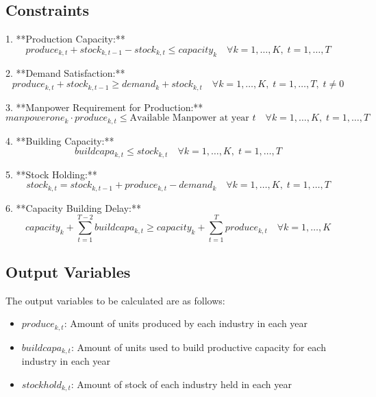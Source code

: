 \documentclass{article}
\begin{document}
\subsection*{Constraints}

1. **Production Capacity:**
   \[
   produce_{k, t} + stock_{k, t-1} - stock_{k, t} \leq capacity_{k} \quad \forall k = 1,\ldots,K, \; t = 1,\ldots,T
   \]

2. **Demand Satisfaction:**
   \[
   produce_{k, t} + stock_{k, t-1} \geq demand_{k} + stock_{k, t} \quad \forall k = 1,\ldots,K, \; t = 1,\ldots,T, \; t \neq 0
   \]

3. **Manpower Requirement for Production:**
   \[
   manpowerone_{k} \cdot produce_{k, t} \leq \text{Available Manpower at year } t \quad \forall k = 1,\ldots,K, \; t = 1,\ldots,T
   \]

4. **Building Capacity:**
   \[
   buildcapa_{k, t} \leq stock_{k, t} \quad \forall k = 1,\ldots,K, \; t = 1,\ldots,T
   \]

5. **Stock Holding:**
   \[
   stock_{k, t} = stock_{k, t-1} + produce_{k, t} - demand_{k} \quad \forall k = 1,\ldots,K, \; t = 1,\ldots,T
   \]

6. **Capacity Building Delay:**
   \[
   capacity_{k} + \sum_{t=1}^{T-2} buildcapa_{k, t} \geq capacity_{k} + \sum_{t=1}^{T} produce_{k, t} \quad \forall k = 1,\ldots,K
   \]

\subsection*{Output Variables}

The output variables to be calculated are as follows:
\begin{itemize}
    \item \( produce_{k, t} \): Amount of units produced by each industry in each year
    \item \( buildcapa_{k, t} \): Amount of units used to build productive capacity for each industry in each year
    \item \( stockhold_{k, t} \): Amount of stock of each industry held in each year
\end{itemize}
\end{document}
